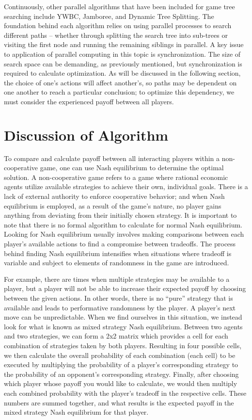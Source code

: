 \documentclass[conference]{IEEEtran}
\begin{document}
Continuously, other parallel algorithms that have been included for game tree searching include YWBC, Jamboree, and Dynamic Tree Splitting. The foundation behind each algorithm relies on using parallel processes to search different paths -- whether through splitting the search tree into sub-trees or visiting the first node and running the remaining siblings in parallel. A key issue to application of parallel computing in this topic is synchronization. The size of search space can be demanding, as previously mentioned, but synchronization is required to calculate optimization. As will be discussed in the following section, the choice of one's actions will affect another's, so paths may be dependent on one another to reach a particular conclusion; to optimize this dependency, we must consider the experienced payoff between all players.
\medskip

\section{Discussion of Algorithm}
To compare and calculate payoff between all interacting players within a non-cooperative game, one can use Nash equilibrium to determine the optimal solution. A non-cooperative game refers to a game where rational economic agents utilize available strategies to achieve their own, individual goals. There is a lack of external authority to enforce cooperative behavior; and when Nash equilibrium is employed, as a result of the game's nature, no player gains anything from deviating from their initially chosen strategy. It is important to note that there is no formal algorithm to calculate for normal Nash equilibrium. Looking for Nash equilibrium usually involves making comparisons between each player's available actions to find a compromise between tradeoffs. The process behind finding Nash equilibrium intensifies when situations where tradeoff is variable and subject to elements of randomness in the game are introduced. 

For example, there are times when multiple strategies may be available to a player, but a player will not be able to increase their expected payoff by choosing between the given actions. In other words, there is no ``pure'' strategy that is available and leads to performative randomness by the player. A player's next move can be unpredictable. When we find ourselves in this situation, we instead look for what is known as mixed strategy Nash equilibrium. Between two agents and two strategies, we can form a 2x2 matrix which provides a cell for each combination of strategies taken by both players. Resulting in four possible cells, we then calculate the overall probability of each combination (each cell) to be executed by multiplying the probability of a player's corresponding strategy to the probability of an opponent's corresponding strategy. Finally, after choosing which player whose payoff you would like to calculate, we would then multiply each combined probability with the player's tradeoff in the respective cells. These numbers are summed together, and what results is the expected payoff in the mixed strategy Nash equilibrium for that player.
\end{document}
